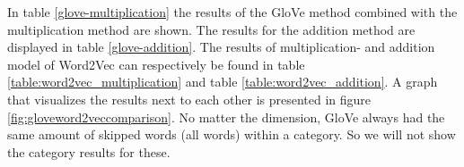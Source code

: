 In table \ref{glove-multiplication} the results of the GloVe method combined with the multiplication method are shown. The results for the addition method are displayed in table \ref{glove-addition}. The results of multiplication- and addition model of Word2Vec can respectively be found in table \ref{table:word2vec_multiplication} and table \ref{table:word2vec_addition}. A graph that visualizes the results next to each other is presented in figure \ref{fig:gloveword2veccomparison}.
\newline
No matter the dimension, GloVe always had the same amount of skipped words (all words) within a category. So we will not show the category results for these.
\label{sec:tabellen}
\begin{table}[H]
	\centering
	\hfill
\end{table}
